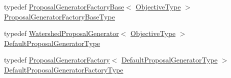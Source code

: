 \begin{DoxyCompactItemize}
typedef \hyperlink{classnifty_1_1graph_1_1lifted__multicut_1_1ProposalGeneratorFactoryBase}{Proposal\+Generator\+Factory\+Base}$<$ \hyperlink{classnifty_1_1graph_1_1lifted__multicut_1_1FusionMoveBased_a1522076835fbbde715134a8902dc4dae}{Objective\+Type} $>$ \hyperlink{classnifty_1_1graph_1_1lifted__multicut_1_1FusionMoveBased_a5694ee53c440514bfeb817b50a14be4b}{Proposal\+Generator\+Factory\+Base\+Type}
\item 
typedef \hyperlink{classnifty_1_1graph_1_1lifted__multicut_1_1WatershedProposalGenerator}{Watershed\+Proposal\+Generator}$<$ \hyperlink{classnifty_1_1graph_1_1lifted__multicut_1_1FusionMoveBased_a1522076835fbbde715134a8902dc4dae}{Objective\+Type} $>$ \hyperlink{classnifty_1_1graph_1_1lifted__multicut_1_1FusionMoveBased_af703c131ea7b4f0c59bda2cd27f6c29c}{Default\+Proposal\+Generator\+Type}
\item 
typedef \hyperlink{classnifty_1_1graph_1_1lifted__multicut_1_1ProposalGeneratorFactory}{Proposal\+Generator\+Factory}$<$ \hyperlink{classnifty_1_1graph_1_1lifted__multicut_1_1FusionMoveBased_af703c131ea7b4f0c59bda2cd27f6c29c}{Default\+Proposal\+Generator\+Type} $>$ \hyperlink{classnifty_1_1graph_1_1lifted__multicut_1_1FusionMoveBased_a668ca7363da00e5aeb55375ea74c22c0}{Default\+Proposal\+Generator\+Factory\+Type}
\end{DoxyCompactItemize}
